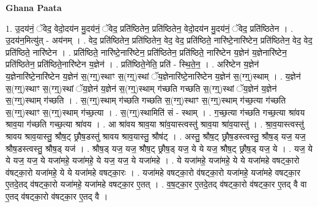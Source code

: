 \documentclass[17pt]{extarticle}
\begin{document}
\textbf{Ghana Paata } \newline

1. उ॒दय॑नं॒ ॅवेद॒ वेदो॒दय॑न मु॒दय॑नं॒ ॅवेद॒ प्रति॑ष्ठितेन॒ प्रति॑ष्ठितेन॒ वेदो॒दय॑न मु॒दय॑नं॒ ॅवेद॒ प्रति॑ष्ठितेन । . उ॒दय॑न॒मित्यु॑त् - अय॑नम् । . वेद॒ प्रति॑ष्ठितेन॒ प्रति॑ष्ठितेन॒ वेद॒ वेद॒ प्रति॑ष्ठिते॒ नारि॑ष्टे॒नारि॑ष्टेन॒ प्रति॑ष्ठितेन॒ वेद॒ वेद॒ प्रति॑ष्ठिते॒ नारि॑ष्टेन । . प्रति॑ष्ठिते॒ नारि॑ष्टे॒नारि॑ष्टेन॒ प्रति॑ष्ठितेन॒ प्रति॑ष्ठिते॒ नारि॑ष्टेन य॒ज्ञेन॑ य॒ज्ञेनारि॑ष्टेन॒ प्रति॑ष्ठितेन॒ प्रति॑ष्ठिते॒नारि॑ष्टेन य॒ज्ञेन॑ । . प्रति॑ष्ठिते॒नेति॒ प्रति॑ - स्थि॒ते॒न॒ । . अरि॑ष्टेन य॒ज्ञेन॑ य॒ज्ञेनारि॑ष्टे॒नारि॑ष्टेन य॒ज्ञेन॑ स॒(ग्ग्॒)स्थाꣳ स॒(ग्ग्॒)स्थां ॅय॒ज्ञेनारि॑ष्टे॒नारि॑ष्टेन य॒ज्ञेन॑ स॒(ग्ग्॒)स्थाम् । . य॒ज्ञेन॑ स॒(ग्ग्॒)स्थाꣳ स॒(ग्ग्॒)स्थां ॅय॒ज्ञेन॑ य॒ज्ञेन॑ स॒(ग्ग्॒)स्थाम् ग॑च्छति गच्छति स॒(ग्ग्॒)स्थां ॅय॒ज्ञेन॑ य॒ज्ञेन॑ स॒(ग्ग्॒)स्थाम् ग॑च्छति । . स॒(ग्ग्॒)स्थाम् ग॑च्छति गच्छति स॒(ग्ग्॒)स्थाꣳ स॒(ग्ग्॒)स्थाम् ग॑च्छ॒त्या ग॑च्छति स॒(ग्ग्॒)स्थाꣳ स॒(ग्ग्॒)स्थाम् ग॑च्छ॒त्या । . स॒(ग्ग्॒)स्थामिति॑ सं - स्थाम् । . ग॒च्छ॒त्या ग॑च्छति गच्छ॒त्या श्रा॑वय श्राव॒या ग॑च्छति गच्छ॒त्या श्रा॑वय । . आ श्रा॑वय श्राव॒या श्रा॑व॒यास्त्वस्तु॑ श्राव॒या श्रा॑व॒यास्तु॑ । . श्रा॒व॒यास्त्वस्तु॑ श्रावय श्राव॒यास्तु॒ श्रौष॒ट् छ्रौष॒डस्तु॑ श्रावय श्राव॒यास्तु॒ श्रौष॑ट् । . अस्तु॒ श्रौष॒ट् छ्रौष॒डस्त्वस्तु॒ श्रौष॒ड् यज॒ यज॒ श्रौष॒डस्त्वस्तु॒ श्रौष॒ड् यज॑ । . श्रौष॒ड् यज॒ यज॒ श्रौष॒ट् छ्रौष॒ड् यज॒ ये ये यज॒ श्रौष॒ट् छ्रौष॒ड् यज॒ ये । . यज॒ ये ये यज॒ यज॒ ये यजा॑महे॒ यजा॑महे॒ ये यज॒ यज॒ ये यजा॑महे । . ये यजा॑महे॒ यजा॑महे॒ ये ये यजा॑महे वषट्का॒रो व॑षट्का॒रो यजा॑महे॒ ये ये यजा॑महे वषट्का॒रः । . यजा॑महे वषट्का॒रो व॑षट्का॒रो यजा॑महे॒ यजा॑महे वषट्का॒र ए॒तदे॒तद् व॑षट्का॒रो यजा॑महे॒ यजा॑महे वषट्का॒र ए॒तत् । . व॒ष॒ट्का॒र ए॒तदे॒तद् व॑षट्का॒रो व॑षट्का॒र ए॒तद् वै वा ए॒तद् व॑षट्का॒रो व॑षट्का॒र ए॒तद् वै । \newline
\end{document}
